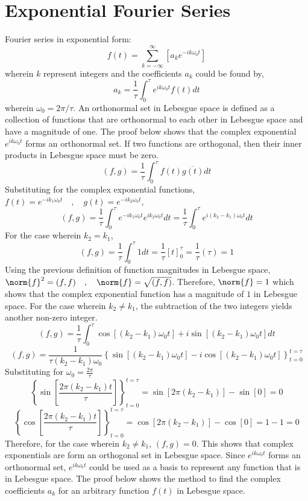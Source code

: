 \section{Exponential Fourier Series}
\begin{comment}
\end{comment}
Fourier series in exponential form:
$$f(t) = \sum^{\infty}_{k = -\infty}\left[a_ke^{-ik\omega_0t}\right]$$
wherein $k$ represent integers and the coefficients $a_k$ could be found by,
$$a_k = \frac{1}{\tau}\int^{\tau}_{0}e^{ik\omega_0t}f(t)dt$$
wherein $\omega_0 = 2\pi/\tau$. An orthonormal set in Lebesgue space is defined as a collection of functions that are orthonormal to each other in Lebesgue space and have a magnitude of one. The proof below shows that the complex exponential $e^{ik\omega_0t}$ forms an orthonormal set. If two functions are orthogonal, then their inner products in Lebesgue space must be zero.
$$(f,g) = \frac{1}{\tau}\int^{\tau}_{0}f(t)\overline{g(t)}dt$$
Substituting for the complex exponential functions, $f(t) = e^{-ik_1\omega_0t}\quad,\quad g(t) = e^{-ik_2\omega_0t}$,
$$(f,g) = \frac{1}{\tau}\int^{\tau}_{0}e^{-ik_1\omega_0t} e^{ik_2\omega_0t}dt = \frac{1}{\tau}\int^{\tau}_{0}e^{i(k_2-k_1)\omega_0t}dt$$
For the case wherein $k_2 = k_1$, 
$$(f,g) = \frac{1}{\tau}\int^{\tau}_{0}1dt = \frac{1}{\tau} \left[t\right]^{\tau}_{0} = \frac{1}{\tau}(\tau) = 1$$
Using the previous definition of function magnitudes in Lebesgue space, $\norm{f}^2 = (f,f)\quad,\quad\norm{f} = \sqrt{(f,f)}$. Therefore, $\norm{f} = 1$ which shows that the complex exponential function has a magnitude of $1$ in Lebesgue space. For the case wherein $k_2 \neq k_1$, the subtraction of the two integers yields another non-zero integer.
$$(f,g) = \frac{1}{\tau}\int^{\tau}_{0} \cos\left[(k_2-k_1)\omega_0t\right] + i\sin\left[(k_2-k_1)\omega_0t\right]dt$$
$$(f,g) = \frac{1}{\tau(k_2-k_1)\omega_0}\left\{\sin\left[(k_2-k_1)\omega_0t\right] - i\cos\left[(k_2-k_1)\omega_0t\right]\right\}^{t = \tau}_{t = 0}$$
Substituting for $\displaystyle{\omega_0 = \frac{2\pi}{\tau}}$ 
$$\left\{\sin\left[\frac{2\pi(k_2-k_1)t}{\tau}\right]\right\}^{t = \tau}_{t = 0} = \sin\left[2\pi(k_2-k_1)\right] - \sin\left[0\right] = 0$$
$$\left\{\cos\left[\frac{2\pi(k_2-k_1)t}{\tau}\right]\right\}^{t = \tau}_{t = 0} = \cos\left[2\pi(k_2-k_1)\right] - \cos\left[0\right] = 1 - 1 = 0$$
Therefore, for the case wherein $k_2 \neq k_1$, $(f,g) = 0$. This shows that complex exponentials are form an orthogonal set in Lebesgue space. Since $e^{ik\omega_0t}$ forms an orthonormal set, $e^{ik\omega_0t}$ could be used as a basis to represent any function that is in Lebesgue space. The proof below shows the method to find the complex coefficients $a_k$ for an arbitrary function $f(t)$ in Lebesgue space.
